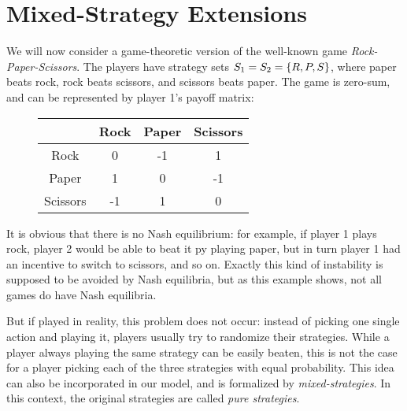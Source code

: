 \documentclass[a4paper]{scrreprt}
\begin{document}
    \section{Mixed-Strategy Extensions}
    
    \begin{ex}
        We will now consider a game-theoretic version of the well-known game \emph{Rock-Paper-Scissors}.
        The players have strategy sets $S_1 = S_2 = \{R, P, S\}$, where paper beats rock, rock beats scissors, and scissors beats paper. The game is zero-sum, and can be represented by player 1's payoff matrix:
        \begin{figure}[h]
            \centering
            \begin{tabular}{c|c|c|c|}
            	         & Rock & Paper & Scissors \\ \hline
            	  Rock   &  0   &  -1   &    1     \\ \hline
            	 Paper   &  1   &   0   &    -1    \\ \hline
            	Scissors &  -1  &   1   &    0     \\ \hline
            \end{tabular}
        \end{figure}
    
        It is obvious that there is no Nash equilibrium: for example, if player 1 plays rock, player 2 would be able to beat it py playing paper, but in turn player 1 had an incentive to switch to scissors, and so on. Exactly this kind of instability is supposed to be avoided by Nash equilibria, but as this example shows, not all games do have Nash equilibria.
        
        But if played in reality, this problem does not occur: instead of picking one single action and playing it, players usually try to randomize their strategies. While a player always playing the same strategy can be easily beaten, this is not the case for a player picking each of the three strategies with equal probability. This idea can also be incorporated in our model, and is formalized by \emph{mixed-strategies}. In this context, the original strategies are called \emph{pure strategies}.
        \label{ex:rockPaperScissors}
    \end{ex}
\end{document}
